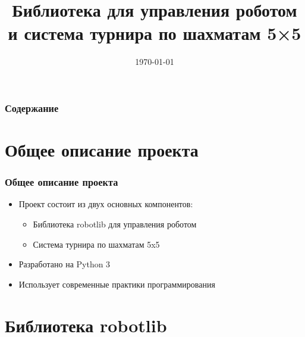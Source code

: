 \documentclass[14pt]{beamer}
\title{Библиотека для управления роботом и система турнира по шахматам 5×5}
\institute{Разработка автоматизированных лабораторных работ с элементами соревнования}
\date{\today}
\begin{document}
\begin{frame}
\titlepage
\end{frame}

\begin{frame}
\frametitle{Содержание}
\tableofcontents
\end{frame}

\section{Общее описание проекта}

\begin{frame}
\frametitle{Общее описание проекта}
\begin{itemize}
\item Проект состоит из двух основных компонентов:
\begin{itemize}
\item Библиотека robotlib для управления роботом
\item Система турнира по шахматам 5x5
\end{itemize}
\item Разработано на Python 3
\item Использует современные практики программирования
\end{itemize}
\end{frame}

\section{Библиотека robotlib}
\end{document}
